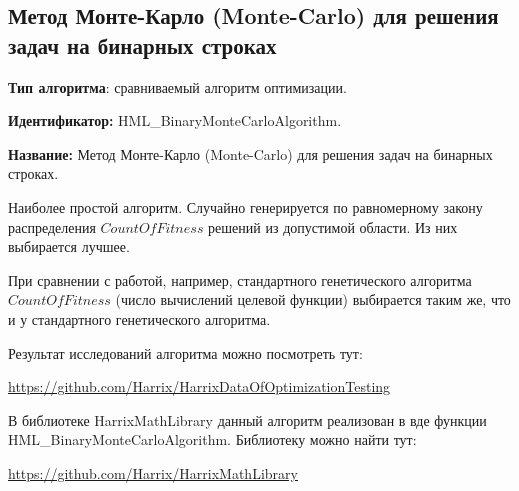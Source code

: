 \subsection{Метод Монте-Карло (Monte-Carlo) для решения задач на бинарных строках}\label{HarrixOptimizationAlgorithms:HML_BinaryMonteCarloAlgorithm}

\textbf{Тип алгоритма}: сравниваемый алгоритм оптимизации.

\textbf{Идентификатор:} HML\_BinaryMonteCarloAlgorithm.

\textbf{Название:} Метод Монте-Карло (Monte-Carlo) для решения задач на бинарных строках.

Наиболее простой алгоритм. Случайно генерируется по равномерному закону распределения $ CountOfFitness $ решений из допустимой области. Из них выбирается лучшее.

При сравнении с работой, например, стандартного генетического алгоритма $ CountOfFitness $ (число вычислений целевой функции) выбирается таким же, что и у стандартного генетического алгоритма.

Результат исследований алгоритма можно посмотреть тут:

\href{https://github.com/Harrix/HarrixDataOfOptimizationTesting}{https://github.com/Harrix/HarrixDataOfOptimizationTesting}

В библиотеке HarrixMathLibrary данный алгоритм реализован в вде функции HML\_BinaryMonteCarloAlgorithm. Библиотеку можно найти тут:

\href{https://github.com/Harrix/HarrixMathLibrary}{https://github.com/Harrix/HarrixMathLibrary}